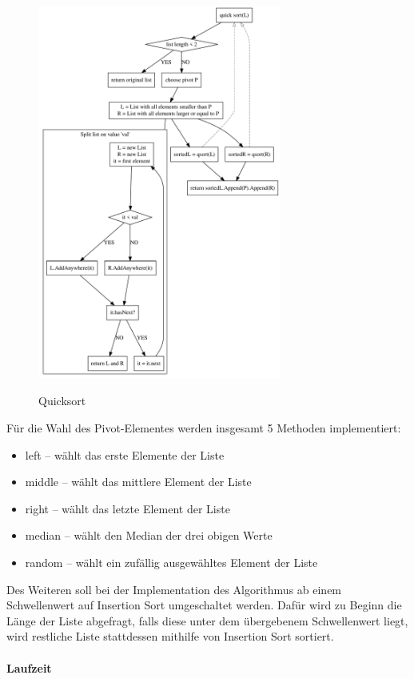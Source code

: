 \documentclass[11pt]{article}
\begin{document}
    \begin{figure}[hbt]
        \caption{Quicksort}
        \centering
        \includegraphics[width = 8cm]{qsort.pdf}\label{fig:qsort}
    \end{figure}

    Für die Wahl des Pivot-Elementes werden insgesamt 5 Methoden implementiert:
    \begin{itemize}
        \item left -- wählt das erste Elemente der Liste
        \item middle -- wählt das mittlere Element der Liste
        \item right -- wählt das letzte Element der Liste
        \item median -- wählt den Median der drei obigen Werte
        \item random -- wählt ein zufällig ausgewähltes Element der Liste
    \end{itemize}

    Des Weiteren soll bei der Implementation des Algorithmus ab einem
    Schwellenwert auf Insertion Sort umgeschaltet werden.
    Dafür wird zu Beginn die Länge der Liste abgefragt, falls diese unter dem
    übergebenem Schwellenwert liegt, wird restliche Liste stattdessen
    mithilfe von Insertion Sort sortiert.

    \FloatBarrier

    \paragraph{Laufzeit}\label{subsec:Qlaufzeit}
\end{document}
